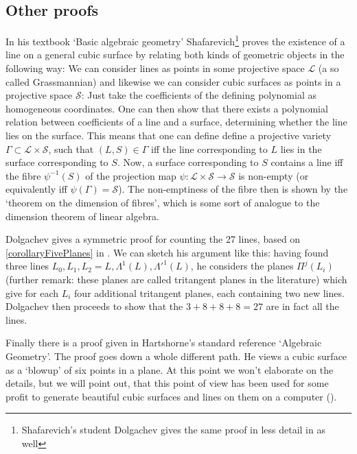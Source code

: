 \subsection{Other proofs}

In his textbook `Basic algebraic geometry' Shafarevich\footnote{Shafarevich's student Dolgachev gives the same proof in less detail in \cite[theorem 9.1.13]{dolgachev2012classical} as well} proves the existence of a line on a general cubic surface by relating both kinds of geometric objects in the following way:
We can consider lines as points in some projective space $\mathcal L$ (a so called Grassmannian) and likewise we can consider cubic surfaces as points in a projective space $\mathcal S$: Just take the coefficients of the defining polynomial as homogeneous coordinates.
One can then show that there exists a polynomial relation between coefficients of a line and a surface, determining whether the line lies on the surface.
This means that one can define define a projective variety $\Gamma \subset \mathcal L \times \mathcal S$, such that $(L,S) \in \Gamma$ iff the line corresponding to $L$ lies in the surface corresponding to $S$.
Now, a surface corresponding to $S$ contains a line iff the fibre $\psi^{-1}(S)$ of the projection map $\psi : \mathcal L \times \mathcal S \to \mathcal S$ is non-empty (or equivalently iff $\psi(\Gamma) = \mathcal S$).
The non-emptiness of the fibre then is shown by the `theorem on the dimension of fibres', which is some sort of analogue to the dimension theorem of linear algebra.

Dolgachev gives a symmetric proof for counting the 27 lines, based on \ref{corollaryFivePlanes} in \cite[theorem 9.1.13]{dolgachev2012classical}.
We can sketch his argument like this: having found three lines $L_0,L_1,L_2 = L,\Lambda^1(L),\Lambda'^1(L)$, he considers the planes $\Pi^j(L_i)$ (further remark: these planes are called tritangent planes in the literature) which give for each $L_i$ four additional tritangent planes, each containing two new lines.
Dolgachev then proceeds to show that the $3+8+8+8 = 27$ are in fact all the lines.

Finally there is a proof given in Hartshorne's standard reference `Algebraic Geometry'.
The proof \cite[theorem 4.9]{hartshorne1977algebraic} goes down a whole different path.
He views a cubic surface as a `blowup' of six points in a plane.
At this point we won't elaborate on the details, but we will point out, that this point of view has been used for some profit to generate beautiful cubic surfaces and lines on them on a computer (\cite{van2003visual}).
